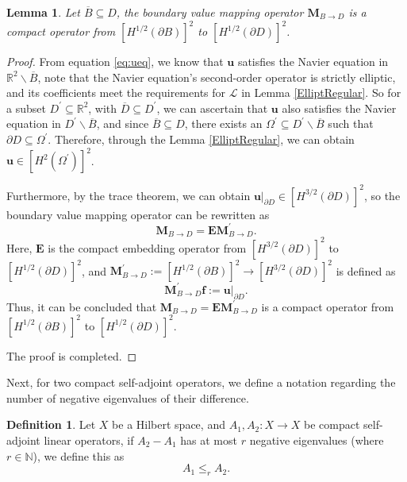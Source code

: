 \documentclass[11pt,reqno,twoside]{amsart}
\newtheorem{lem}{Lemma}[section]
\theoremstyle{definition}
\newtheorem{defn}{Definition}[section]
\theoremstyle{remark}
\numberwithin{equation}{section}
\begin{document}
\begin{lem}\label{BoundaryVCompac}
	Let $\overline{B}\subseteq D$, the boundary value mapping operator $ \mathbf M_{B \to D}$ is a compact operator from $ \left[H^{1/2}\left(\partial B \right) \right]^2 $ to $\left[H^{1/2}\left(\partial D \right) \right]^2$.
\end{lem}
\begin{proof}
 From equation \eqref{eq:ueq}, we know that $\mathbf u$ satisfies the Navier equation in $\mathbb R^2 \backslash \overline{B}$, note that the Navier equation's second-order operator is strictly elliptic, and its coefficients meet the requirements for $\mathcal{L}$ in Lemma \ref{ElliptRegular}. So for a subset $D^{'}\subseteq \mathbb R^2$, with $\overline{D}\subseteq D^{'} $, we can ascertain that $\mathbf u$ also satisfies the Navier equation in $D^{'}\backslash \overline{B}$, and since $\overline{B}\subseteq D$, there exists an $\Omega^{'}\subseteq D^{'} \backslash \overline{B}$ such that $\partial D\subseteq \Omega^{'}$. Therefore, through the Lemma \ref{ElliptRegular}, we can obtain  $\mathbf u\in \left[H^{2}\left(\Omega^{'} \right) \right]^2$. 
 
 Furthermore, by the trace theorem, we can obtain $\mathbf u |_{\partial D} \in \left[H^{3/2}\left(\partial D \right) \right]^2$, so the boundary value mapping operator can be rewritten as
 $$
 \mathbf M_{B \to D} = \mathbf E \mathbf M^{'}_{B \to D}.
 $$
Here, $\mathbf E$ is the compact embedding operator from $\left[H^{3/2}\left(\partial D \right) \right]^2$ to $\left[H^{1/2}\left(\partial D \right) \right]^2$, and $\mathbf M^{'}_{B \to D} := \left[H^{1/2}\left(\partial B \right) \right]^2 \to \left[H^{3/2}\left(\partial D \right) \right]^2$ is defined as
$$
\mathbf M^{'}_{B \to D} \mathbf f:= \mathbf u |_{\partial D}.
$$
Thus, it can be concluded that $ \mathbf M_{B \to D}=\mathbf E \mathbf M^{'}_{B \to D}$ is a compact operator from $\left[H^{1/2}\left(\partial B \right) \right]^2$ to $\left[H^{1/2}\left(\partial D \right) \right]^2$.

The proof is completed.
\end{proof}
Next, for two compact self-adjoint operators, we define a notation regarding the number of negative eigenvalues of their difference.
\begin{defn} \label{defleq} 
	Let $X$ be a Hilbert space, and $A_1,A_2: X \to X $ be compact self-adjoint linear operators, if $A_2-A_1$ has at most $r$ negative eigenvalues (where $r\in \mathbb N$), we define this as
	$$
	A_1 \leq_r A_2.
	$$
\end{defn}
\end{document}
